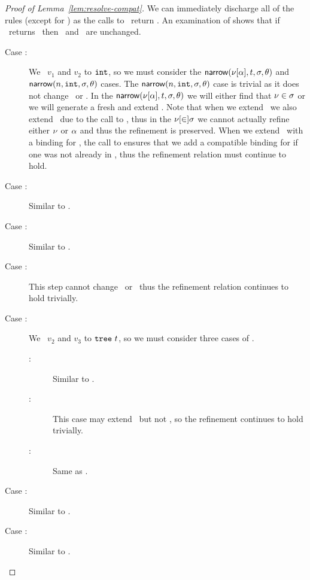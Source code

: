 \begin{proof}[Proof of Lemma~\ref{lem:resolve-compat}]
  We can immediately discharge all of the  rules
  (except for \renodebadone) as the calls to \forcesym\ return \stuck.
  An examination of \forcesym shows that if \forcesym\ returns \stuck\
  then \vsu\ and \tsu\ are unchanged.
  \begin{description}
  \item[Case \replusgood:]
    We \forcesym\ $v_1$ and $v_2$ to $\mathtt{int}$, so we must consider
    the $\mathsf{narrow}(\nu[\alpha], t, \sigma, \theta)$ and
    $\mathsf{narrow}(n, \mathtt{int}, \sigma, \theta)$ cases.
    The $\mathsf{narrow}(n, \mathtt{int}, \sigma, \theta)$ case is trivial as it does
    not change \vsu\ or \tsu.
    In the $\mathsf{narrow}(\nu[\alpha], t, \sigma, \theta)$ we will either
    find that $\nu \in \sigma$ or we will generate a fresh \tint
    and extend \vsu.
    Note that when we extend \vsu\ we also extend \tsu\ due to the
    call to \unifysym, thus in the $\nu[\in] \sigma$ we cannot
    actually refine either $\nu$ or $\alpha$ and thus the
    refinement is preserved.
    When we extend \vsu\ with a binding for \ehole, the call to
    \unifysym ensures that we add a compatible binding for
    \thole if one was not already in \tsu, thus the refinement
    relation must continue to hold.
  \item[Case :]
    Similar to \replusgood.
  \item[Case \reappgood:]
    Similar to \replusgood.
  \item[Case \releafgood:]
    This step cannot change \vsu\ or \tsu\ thus the refinement
    relation continues to hold trivially.
  \item[Case \renodegood:]
    We \forcesym\ $v_2$ and $v_3$ to $\mathtt{tree}\ t$, so we must consider
    three cases of \forcesym.
    \begin{description}
    \item[:]
      Similar to \replusgood.
    \item[:]
      This case may extend \tsu\ but not \vsu, so the refinement
      continues to hold trivially.
    \item[:]
      Same as .
    \end{description}
  \item[Case :]
    Similar to \replusgood.
  \item[Case \repcasegood:]
    Similar to \replusgood.
  \end{description}
\end{proof}



